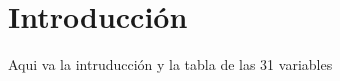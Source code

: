 \section{Introducción}

Aqui va la intruducción y la tabla de las 31 variables


\cite{mitchell1997machine}
